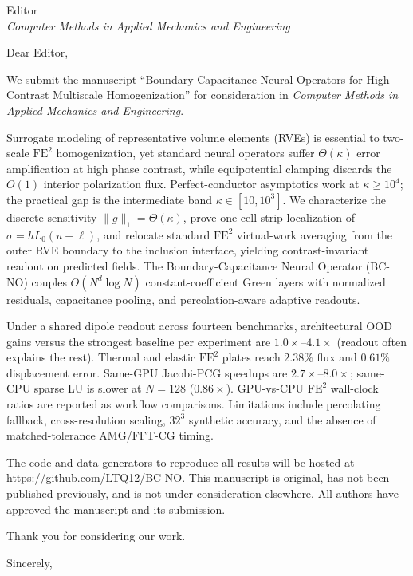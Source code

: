 \documentclass[10pt]{letter}
\begin{document}
\begin{letter}{Editor\\
\textit{Computer Methods in Applied Mechanics and Engineering}}

\opening{Dear Editor,}

We submit the manuscript ``Boundary-Capacitance Neural Operators for High-Contrast Multiscale Homogenization'' for consideration in \textit{Computer Methods in Applied Mechanics and Engineering}.

Surrogate modeling of representative volume elements (RVEs) is essential to two-scale $\mathrm{FE}^2$ homogenization, yet standard neural operators suffer $\Theta(\kappa)$ error amplification at high phase contrast, while equipotential clamping discards the $O(1)$ interior polarization flux. Perfect-conductor asymptotics work at $\kappa\ge 10^4$; the practical gap is the intermediate band $\kappa\in[10,10^3]$. We characterize the discrete sensitivity $\|g\|_1=\Theta(\kappa)$, prove one-cell strip localization of $\sigma=h L_0(u-\ell)$, and relocate standard $\mathrm{FE}^2$ virtual-work averaging from the outer RVE boundary to the inclusion interface, yielding contrast-invariant readout on predicted fields. The Boundary-Capacitance Neural Operator (BC-NO) couples $O(N^d\log N)$ constant-coefficient Green layers with normalized residuals, capacitance pooling, and percolation-aware adaptive readouts.

Under a shared dipole readout across fourteen benchmarks, architectural OOD gains versus the strongest baseline per experiment are $1.0\times$--$4.1\times$ (readout often explains the rest). Thermal and elastic $\mathrm{FE}^2$ plates reach $2.38\%$ flux and $0.61\%$ displacement error. Same-GPU Jacobi-PCG speedups are $2.7\times$--$8.0\times$; same-CPU sparse LU is slower at $N=128$ ($0.86\times$). GPU-vs-CPU $\mathrm{FE}^2$ wall-clock ratios are reported as workflow comparisons. Limitations include percolating fallback, cross-resolution scaling, $32^3$ synthetic accuracy, and the absence of matched-tolerance AMG/FFT-CG timing.

The code and data generators to reproduce all results will be hosted at \url{https://github.com/LTQ12/BC-NO}. This manuscript is original, has not been published previously, and is not under consideration elsewhere. All authors have approved the manuscript and its submission.

Thank you for considering our work.

\closing{Sincerely,}

\end{letter}
\end{document}
